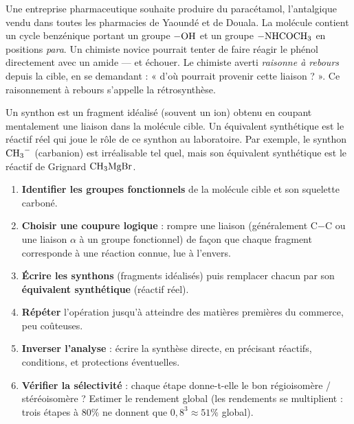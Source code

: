 \documentclass[11pt]{article}
\newcommand{\cle}[1]{{\popxbold\color{popdark}#1}}
\begin{document}
\begin{experience}
Une entreprise pharmaceutique souhaite produire du paracétamol, l'antalgique vendu dans toutes les pharmacies de Yaoundé et de Douala. La molécule contient un cycle benzénique portant un groupe $-\ce{OH}$ et un groupe $-\ce{NHCOCH3}$ en positions \emph{para}. Un chimiste novice pourrait tenter de faire réagir le phénol directement avec un amide — et échouer. Le chimiste averti \emph{raisonne à rebours} depuis la cible, en se demandant : « d'où pourrait provenir cette liaison ? ». Ce raisonnement à rebours s'appelle la \cle{rétrosynthèse}.
\end{experience}

\begin{definition}
Un \cle{synthon} est un fragment idéalisé (souvent un ion) obtenu en coupant mentalement une liaison dans la molécule cible. Un \cle{équivalent synthétique} est le réactif réel qui joue le rôle de ce synthon au laboratoire. Par exemple, le synthon $\ce{CH3^{-}}$ (carbanion) est irréalisable tel quel, mais son équivalent synthétique est le réactif de Grignard $\ce{CH3MgBr}$.
\end{definition}

\begin{methode}
\begin{enumerate}
\item \textbf{Identifier les groupes fonctionnels} de la molécule cible et son squelette carboné.
\item \textbf{Choisir une coupure logique} : rompre une liaison (généralement C$-$C ou une liaison $\alpha$ à un groupe fonctionnel) de façon que chaque fragment corresponde à une réaction connue, lue à l'envers.
\item \textbf{Écrire les synthons} (fragments idéalisés) puis remplacer chacun par son \textbf{équivalent synthétique} (réactif réel).
\item \textbf{Répéter} l'opération jusqu'à atteindre des matières premières du commerce, peu coûteuses.
\item \textbf{Inverser l'analyse} : écrire la synthèse directe, en précisant réactifs, conditions, et protections éventuelles.
\item \textbf{Vérifier la sélectivité} : chaque étape donne-t-elle le bon régioisomère / stéréoisomère ? Estimer le rendement global (les rendements se multiplient : trois étapes à $80\%$ ne donnent que $0,8^3 \approx 51\%$ global).
\end{enumerate}
\end{methode}
\end{document}
